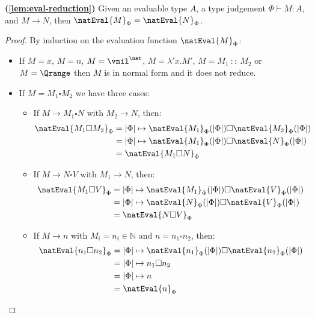 \begin{lemma}{\!\textbf{(\ref{lem:eval-reduction})}}
    Given an evaluable type $A$,
    a type judgement $\Phi \vdash M : A$, and $M \to N$, then $\natEval{M}_\Phi = \natEval{N}_\Phi$.
\end{lemma}

\begin{proof}
    By induction on the evaluation function $\natEval{M}_\Phi$:
    \begin{itemize}
        \item If $M=x$, $M=n$, $M=\vnil^\nat$, $M=\lambda'x. M'$, $M= M_1\ ::\ M_2$ or $M=\Qrange$ then $M$ is in normal form and it does not reduce.
        
        \item If $M = M_1\square M_2$ we have three cases:
        \begin{itemize}
            \item If $M\to M_1\square N$ with $M_2\to N$, then: 
            \begin{align*}
            \natEval{M_1 \square M_2}_\Phi &= |\Phi| \mapsto \natEval{M_1}_\Phi(|\Phi|) \square \natEval{M_2}_\Phi(|\Phi|)\\ 
            &= |\Phi| \mapsto \natEval{M_1}_\Phi(|\Phi|) \square \natEval{N}_\Phi(|\Phi|)\\
            &= \natEval{M_1 \square N}_\Phi\\
            \end{align*}

            \item If $M\to N\square V$ with $M_1\to N$, then: 
            \begin{align*}
            \natEval{M_1 \square V}_\Phi &= |\Phi| \mapsto \natEval{M_1}_\Phi(|\Phi|) \square \natEval{V}_\Phi(|\Phi|)\\ 
            &= |\Phi| \mapsto \natEval{N}_\Phi(|\Phi|) \square \natEval{V}_\Phi(|\Phi|)\\
            &= \natEval{N \square V}_\Phi\\
            \end{align*}

            \item If $M\to n$ with $M_i = n_i\in\mathbb{N}$ and $n= n_1\square n_2$, then: 
            \begin{align*}
            \natEval{n_1 \square n_2}_\Phi &= |\Phi| \mapsto \natEval{n_1}_\Phi(|\Phi|) \square \natEval{n_2}_\Phi(|\Phi|)\\ 
            &= |\Phi| \mapsto n_1\square n_2\\
            &= |\Phi| \mapsto n\\
            &= \natEval{n}_\Phi 
            \end{align*}
        \end{itemize}


\end{itemize}
\end{proof}

